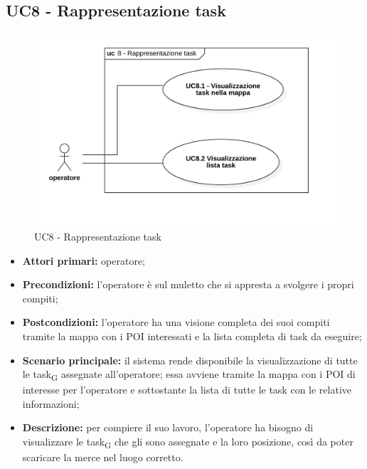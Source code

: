 \subsection{UC8 - Rappresentazione task}

\begin{figure}[H]
	\centering
	\includegraphics[scale=0.52]{res/images/uc8.png}
	\caption{UC8 - Rappresentazione task}
\end{figure}


\begin{itemize}
	\item 	\textbf{Attori primari:} operatore;
	\item 	\textbf{Precondizioni:} l'operatore è sul muletto che si appresta a svolgere i propri compiti;
	\item 	\textbf{Postcondizioni:} l'operatore ha una visione completa dei suoi compiti tramite la mappa con i POI interessati e la lista completa di task da eseguire;
	\item 	\textbf{Scenario principale:} il sistema rende disponibile la visualizzazione di tutte le task\textsubscript{G} assegnate all'operatore; essa avviene tramite la mappa con i POI di interesse per l'operatore e sottostante la lista di tutte le task con le relative informazioni;
	\item 	\textbf{Descrizione:} per compiere il suo lavoro, l'operatore ha bisogno di visualizzare le task\textsubscript{G} che gli sono assegnate e la loro posizione, così da poter scaricare la merce nel luogo corretto.

\end{itemize}

